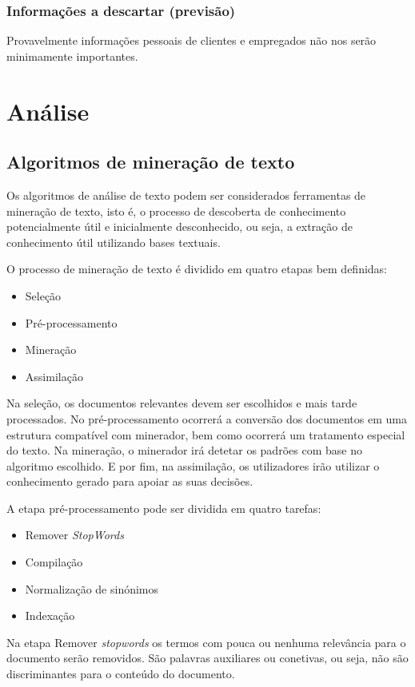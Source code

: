 \documentclass[a4paper,10pt]{article}
\begin{document}
\subsubsection{Informações a descartar (previsão)}

Provavelmente informações pessoais de clientes e empregados não nos serão minimamente importantes.

\section{Análise}
\subsection{Algoritmos de mineração de texto}

Os algoritmos de análise de texto podem ser considerados ferramentas de mineração de texto, isto é, o processo de descoberta de conhecimento potencialmente útil e inicialmente desconhecido, ou seja, a extração de conhecimento útil utilizando bases textuais.

O processo de mineração de texto é dividido em quatro etapas bem definidas:
\begin{itemize}
  \item Seleção
  \item Pré-processamento
  \item Mineração
  \item Assimilação
\end{itemize}

Na seleção, os documentos relevantes devem ser escolhidos e mais tarde processados.
No pré-processamento ocorrerá a conversão dos documentos em uma estrutura compatível com minerador, bem como ocorrerá um tratamento especial do texto.
Na mineração, o minerador irá detetar os padrões com base no algoritmo escolhido.
E por fim, na assimilação, os utilizadores irão utilizar o conhecimento gerado para apoiar as suas decisões.

A etapa pré-processamento pode ser dividida em quatro tarefas:
\begin{itemize}
  \item Remover \textit{StopWords}
  \item Compilação
  \item Normalização de sinónimos
  \item Indexação
\end{itemize}

Na etapa Remover \textit{stopwords} os termos com pouca ou nenhuma relevância para o documento serão removidos.
São palavras auxiliares ou conetivas, ou seja, não são discriminantes para o conteúdo do documento.
\end{document}
